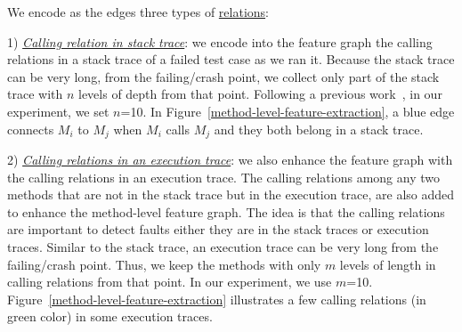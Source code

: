 
We encode as the edges three types of \underline{relations}:

1) {\em \underline{Calling relation in stack trace}}: we encode into
the feature graph the calling relations in a stack trace of a failed
test case as we ran it. Because the stack trace can be very long, from
the failing/crash point, we collect only part of the stack trace with
$n$ levels of depth from that point. Following a previous
work~\cite{crashlocator-issta14}, in our experiment, we set $n$=10. In
Figure~\ref{method-level-feature-extraction}, a blue edge connects
$M_i$ to $M_j$ when $M_i$ calls $M_j$ and they both belong in a stack
trace.


2) {\em \underline{Calling relations in an execution trace}}:
we also enhance the feature graph with the calling relations in an
execution trace. The calling relations among any two
methods that are not in the stack trace but in the execution trace,
are also added to enhance the method-level feature graph. The idea is
that the calling relations are important to detect faults either they
are in the stack traces or execution traces. Similar to the stack
trace, an execution trace can be very long from the failing/crash
point. Thus, we keep the methods with only $m$ levels of length in
calling relations from that point. In our experiment, we use
$m$=10. Figure~\ref{method-level-feature-extraction} illustrates a few
calling relations (in green color) in some execution traces.


